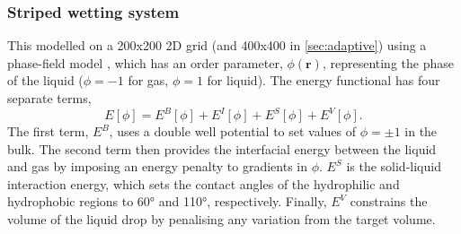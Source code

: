 \documentclass[twocolumn,10pt]{revtex4}
\begin{document}
\subsubsection{Striped wetting system}
This modelled on a 200x200 2D grid (and 400x400 in \cref{sec:adaptive}) using a phase-field model \cite{Panter2019b}, which has an order parameter, $\phi(\bm{r})$, representing the phase of the liquid ($\phi=-1$ for gas, $\phi=1$ for liquid).
The energy functional has four separate terms,
\begin{equation} \label{eq:phasefield}
  E[\phi] = E^B[\phi] + E^I[\phi] + E^S[\phi] + E^V[\phi].
\end{equation}
The first term, $E^B$, uses a double well potential to set values of $\phi=\pm1$ in the bulk.
The second term then provides the interfacial energy between the liquid and gas by imposing an energy penalty to gradients in $\phi$.
$E^S$ is the solid-liquid interaction energy, which sets the contact angles of the hydrophilic and hydrophobic regions to 60\si{\degree} and 110\si{\degree}, respectively.
Finally, $E^V$ constrains the volume of the liquid drop by penalising any variation from the target volume.
\end{document}
